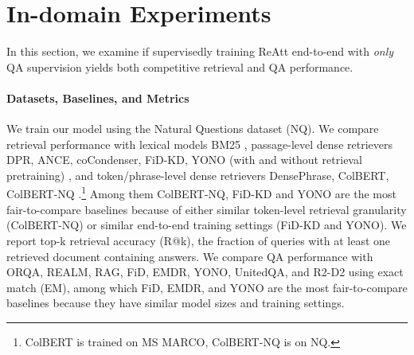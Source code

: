\documentclass[11pt, dvipsnames]{article}
\newcommand{\ours}{ReAtt\xspace}
\newcommand{\msm}{MS MARCO\xspace}
\begin{document}
\section{In-domain Experiments}
In this section, we examine if supervisedly training \ours end-to-end with \emph{only} QA supervision yields both competitive retrieval and QA performance.

\paragraph{Datasets, Baselines, and Metrics}
We train our model using the Natural Questions dataset (NQ).
We compare retrieval performance with lexical models BM25 \cite{bm25-2009-robertson}, passage-level dense retrievers DPR, ANCE, coCondenser, FiD-KD, YONO (with and without retrieval pretraining) \cite{dpr-2020-karpukhin,dpr-paq-2021-oguz,ance-2021-xiong,cocondenser-2022-gao,fid-kd-2021-izacard,yono-2021-lee}, and token/phrase-level dense retrievers DensePhrase, ColBERT, ColBERT-NQ \cite{densephraseret-2021-lee,colbert-2020-khattab,colbertnq-2020-khattab}.\footnote{\scriptsize ColBERT is trained on \msm, ColBERT-NQ is on NQ.}
Among them ColBERT-NQ, FiD-KD and YONO are the most fair-to-compare baselines because of either similar token-level retrieval granularity (ColBERT-NQ) or similar end-to-end training settings (FiD-KD and YONO).
We report top-k retrieval accuracy (R@k), the fraction of queries with at least one retrieved document containing answers.
We compare QA performance with ORQA, REALM, RAG, FiD, EMDR, YONO, UnitedQA, and R2-D2 \cite{orqa-2019-lee,realm-2020-guu,rag-2020-lewis,fid-2021-izacard,fid-kd-2021-izacard,emdr2-2021-sachan,yono-2021-lee,unitedqa-2021-cheng,r2d2-2021-fajcik} using exact match (EM), among which FiD, EMDR, and YONO are the most fair-to-compare baselines because they have similar model sizes and training settings.
\end{document}
